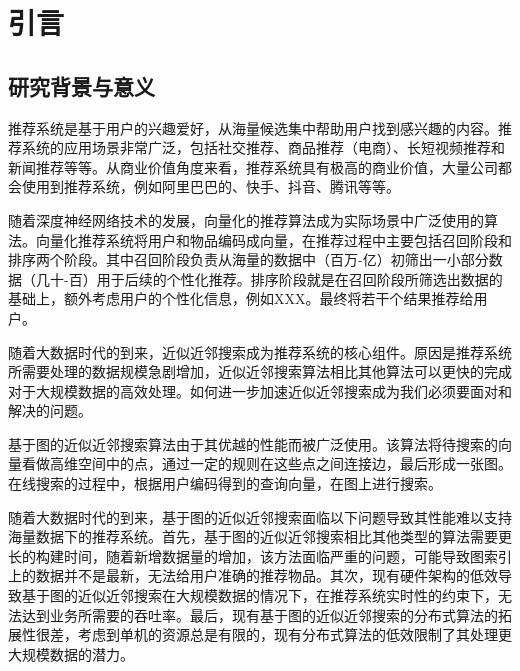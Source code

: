 
\chapter{引言}

\section{研究背景与意义}
推荐系统是基于用户的兴趣爱好，从海量候选集中帮助用户找到感兴趣的内容。推荐系统的应用场景非常广泛，包括社交推荐、商品推荐（电商）、长短视频推荐和新闻推荐等等。从商业价值角度来看，推荐系统具有极高的商业价值，大量公司都会使用到推荐系统，例如阿里巴巴的、快手、抖音、腾讯等等。


随着深度神经网络技术的发展，向量化的推荐算法成为实际场景中广泛使用的算法。向量化推荐系统将用户和物品编码成向量，在推荐过程中主要包括召回阶段和排序两个阶段。其中召回阶段负责从海量的数据中（百万-亿）初筛出一小部分数据（几十-百）用于后续的个性化推荐。排序阶段就是在召回阶段所筛选出数据的基础上，额外考虑用户的个性化信息，例如XXX。最终将若干个结果推荐给用户。


随着大数据时代的到来，近似近邻搜索成为推荐系统的核心组件。原因是推荐系统所需要处理的数据规模急剧增加，近似近邻搜索算法相比其他算法可以更快的完成对于大规模数据的高效处理。如何进一步加速近似近邻搜索成为我们必须要面对和解决的问题。

基于图的近似近邻搜索算法由于其优越的性能而被广泛使用。该算法将待搜索的向量看做高维空间中的点，通过一定的规则在这些点之间连接边，最后形成一张图。在线搜索的过程中，根据用户编码得到的查询向量，在图上进行搜索。

随着大数据时代的到来，基于图的近似近邻搜索面临以下问题导致其性能难以支持海量数据下的推荐系统。首先，基于图的近似近邻搜索相比其他类型的算法需要更长的构建时间，随着新增数据量的增加，该方法面临严重的问题，可能导致图索引上的数据并不是最新，无法给用户准确的推荐物品。其次，现有硬件架构的低效导致基于图的近似近邻搜索在大规模数据的情况下，在推荐系统实时性的约束下，无法达到业务所需要的吞吐率。最后，现有基于图的近似近邻搜索的分布式算法的拓展性很差，考虑到单机的资源总是有限的，现有分布式算法的低效限制了其处理更大规模数据的潜力。

